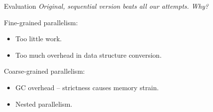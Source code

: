 \documentclass[slidestop,compress,mathserif, xcolor=table]{beamer}
\newcommand{\emp}[1]{\textit{\textcolor{scigreen}{#1}}}
\begin{document}

\begin{frame}[c]{Evaluation}
\emp{Original, sequential version beats all our attempts. Why?}\\
\bigskip
\pause

Fine-grained parallelism:
\begin{itemize}
\item Too little work.
\item Too much overhead in data structure conversion.
\end{itemize}
\bigskip
\pause

Coarse-grained parallelism:
\begin{itemize}
\item GC overhead -- strictness causes memory strain.
\item Nested parallelism.
\end{itemize}
\end{frame}
\end{document}
